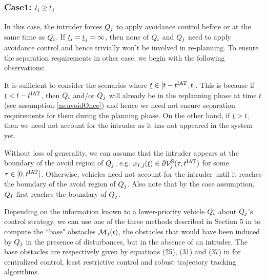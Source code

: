 \subsubsection{Case1: $\underline{t}_i \geq \underline{t}_j$} \label{sec:case1}
In this case, the intruder forces $Q_j$ to apply avoidance control before or at the same time as $Q_i$. If $\underline{t}_i = \underline{t}_j = \infty$, then none of $Q_i$ and $Q_j$ need to apply avoidance control and hence trivially won't be involved in re-planning. To ensure the separation requirements in other case, we begin with the following observations:

\begin{observation} \label{obs1_case1}
It is sufficient to consider the scenarios where $\underline{t} \in [t-t^\text{IAT}, t]$. This is because if $\underline{t} < t - t^\text{IAT}$, then $Q_i$ and/or $Q_j$ will already be in the replanning phase at time $t$ (see assumption \ref{as:avoidOnce}) and hence we need not ensure separation requirements for them during the planning phase. On the other hand, if $\underline{t} > t$, then we need not account for the intruder as it has not appeared in the system yet. %
\end{observation}

\begin{observation} \label{obs2_case1}
Without loss of generality, we can assume that the intruder appears at the boundary of the avoid region of $Q_j$, e.g. $x_{I, j}(\underline{t}) \in \partial \mathcal{V}^{\text{S}}_{j}(\tau, t^\text{IAT})$ for some $\tau \in [0, t^\text{IAT}]$. Otherwise, vehicles need not account for the intruder until it reaches the boundary of the avoid region of $Q_j$. Also note that by the case assumption, $Q_{I}$ first reaches the boundary of $Q_j$. 
\end{observation}


Depending on the information known to a lower-priority vehicle $Q_i$ about $Q_j$'s control strategy, we can use one of the three methods described in Section 5 in \cite{chen2016robust} to compute the ``base" obstacles $\mathcal{M}_j(t)$, the obstacles that would have been induced by $Q_j$ in the presence of disturbances, but in the absence of an intruder. The base obstacles are respectively given by equations (25), (31) and (37) in \cite{chen2016robust} for centralized control, least restrictive control and robust trajectory tracking algorithms.

